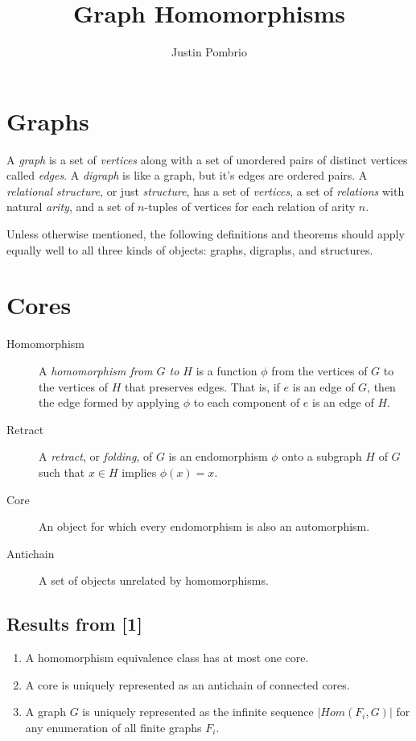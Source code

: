 \documentclass{article}
\begin{document}
\title{Graph Homomorphisms}
\author{Justin Pombrio}
\maketitle

\section{Graphs}

A \emph{graph} is a set of \emph{vertices} along with a set of
unordered pairs of distinct vertices called \emph{edges}. A
\emph{digraph} is like a graph, but it's edges are ordered pairs. A
\emph{relational structure}, or just \emph{structure}, has a set of
\emph{vertices}, a set of \emph{relations} with natural \emph{arity},
and a set of $n$-tuples of vertices for each relation of arity $n$.

Unless otherwise mentioned, the following definitions and theorems
should apply equally well to all three kinds of objects: graphs,
digraphs, and structures.

\section{Cores}

\begin{description}
\item[Homomorphism] A \emph{homomorphism from $G$ to $H$} is a
  function $\phi$ from the vertices of $G$ to the vertices of $H$ that
  preserves edges. That is, if $e$ is an edge of $G$, then the edge
  formed by applying $\phi$ to each component of $e$ is an edge of
  $H$.
\item[Retract] A \emph{retract}, or \emph{folding}, of $G$ is an
  endomorphism $\phi$ onto a subgraph $H$ of $G$ such that $x \in H$
  implies $\phi(x) = x$.
\item[Core] An object for which every endomorphism is also an
  automorphism.
\item[Antichain] A set of objects unrelated by homomorphisms.
\end{description}

\subsection{Results from [1]}
\begin{enumerate}
\item A homomorphism equivalence class has at most one core.
\item A core is uniquely represented as an antichain of connected
  cores.
\item A graph $G$ is uniquely represented as the infinite sequence
  $|Hom(F_i, G)|$ for any enumeration of all finite graphs $F_i$.
\end{enumerate}
\end{document}

